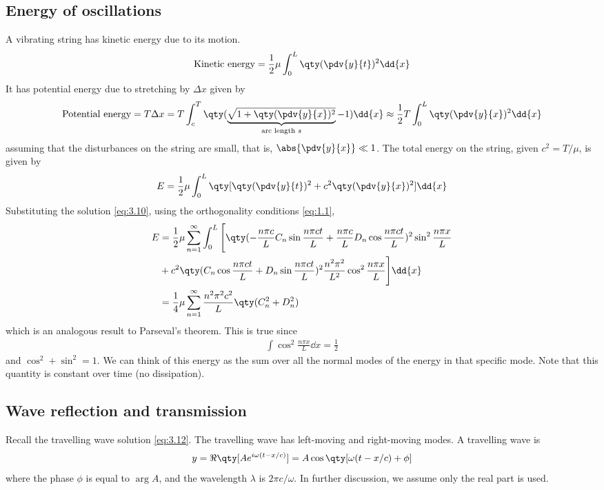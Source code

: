 \subsection{Energy of oscillations}
A vibrating string has kinetic energy due to its motion.
\begin{align*}
	\text{Kinetic energy} = \frac{1}{2} \mu \int_0^L \qty(\pdv{y}{t})^2 \dd{x}
\end{align*}
It has potential energy  due to stretching by $\Delta x$ given by
\begin{align*}
	\text{Potential energy} = T \Delta x = T \int_c^T \qty(\underbrace{\sqrt{1 + \qty(\pdv{y}{x})^2}}_\text{arc length $s$} -1)\dd{x} \approx \frac{1}{2} T \int_0^L \qty(\pdv{y}{x})^2 \dd{x}
\end{align*}
assuming that the disturbances on the string are small, that is, $\abs{\pdv{y}{x}} \ll 1$.
The total energy on the string, given $c^2 = T/\mu$, is given by
\begin{align} \label{eq:3.13}
	E = \frac{1}{2}\mu \int_0^L \qty[\qty(\pdv{y}{t})^2 + c^2 \qty(\pdv{y}{x})^2] \dd{x}
\end{align}
Substituting the solution \cref{eq:3.10}, using the orthogonality conditions \cref{eq:1.1},
\begin{align}
	E &= \frac{1}{2}\mu \sum_{n=1}^\infty \int_0^L \Bigg[\qty(-\frac{n \pi c}{L} C_n \sin \frac{n \pi c t}{L} + \frac{n \pi c}{L} D_n \cos \frac{n \pi c t}{L})^2 \sin^2 \frac{n \pi x}{L}\notag \\
	&+ c^2 \qty(C_n \cos \frac{n \pi c t}{L} + D_n \sin \frac{n \pi c t}{L})^2 \frac{n^2 \pi^2}{L^2} \cos^2 \frac{n \pi x}{L} \Bigg] \dd{x} \notag \\
	&= \frac{1}{4} \mu \sum_{n=1}^\infty \frac{n^2 \pi^2 c^2}{L} \qty(C_n^2 + D_n^2) \label{eq:3.14}
\end{align}
which is an analogous result to Parseval's theorem.
This is true since \begin{align*}
	\int \cos^2 \frac{n \pi x}{L}\dd{x} = \frac{1}{2}
\end{align*} and $\cos^2 + \sin^2 = 1$.
We can think of this energy as the sum over all the normal modes of the energy in that specific mode.
Note that this quantity is constant over time (no dissipation).

\subsection{Wave reflection and transmission}
Recall the travelling wave solution \cref{eq:3.12}.
The travelling wave has left-moving and right-moving modes.
A  travelling wave is
\begin{align*}
	y = \Re\qty[ A e^{i \omega(t-x/c)} ] = A \cos \qty[\omega(t-x/c) + \phi]
\end{align*}
where the phase $\phi$ is equal to $\arg A$, and the wavelength $\lambda$ is $2 \pi c / \omega$.
In further discussion, we assume only the real part is used.

